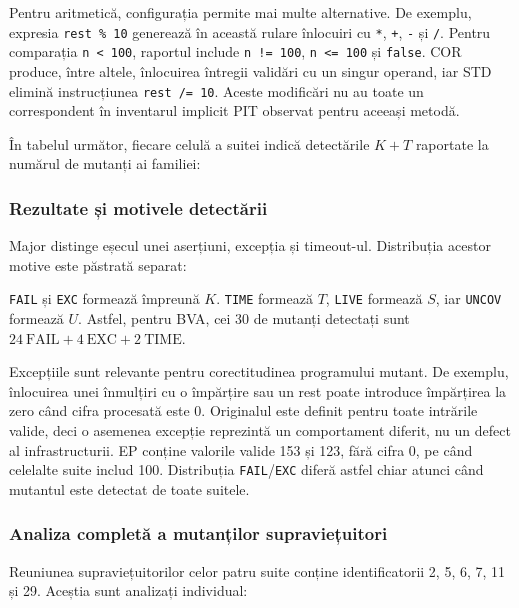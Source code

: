 \documentclass[11pt,a4paper]{article}
\begin{document}
Pentru aritmetică, configurația permite mai multe alternative.
De exemplu, expresia \texttt{rest \% 10} generează în această rulare
înlocuiri cu \texttt{*}, \texttt{+}, \texttt{-} și \texttt{/}.
Pentru comparația \texttt{n < 100}, raportul include
\texttt{n != 100}, \texttt{n <= 100} și \texttt{false}.
COR produce, între altele, înlocuirea întregii validări cu un singur operand,
iar STD elimină instrucțiunea \texttt{rest /= 10}.
Aceste modificări nu au toate un correspondent în inventarul implicit PIT
observat pentru aceeași metodă.

În tabelul următor, fiecare celulă a suitei indică detectările $K+T$
raportate la numărul de mutanți ai familiei:


\subsubsection{Rezultate și motivele detectării}


Major distinge eșecul unei aserțiuni, excepția și timeout-ul.
Distribuția acestor motive este păstrată separat:

\texttt{FAIL} și \texttt{EXC} formează împreună $K$.
\texttt{TIME} formează $T$, \texttt{LIVE} formează $S$, iar
\texttt{UNCOV} formează $U$.
Astfel, pentru BVA, cei 30 de mutanți detectați sunt
$24\ \mathrm{FAIL}+4\ \mathrm{EXC}+2\ \mathrm{TIME}$.

Excepțiile sunt relevante pentru corectitudinea programului mutant.
De exemplu, înlocuirea unei înmulțiri cu o împărțire sau un rest poate
introduce împărțirea la zero când cifra procesată este 0.
Originalul este definit pentru toate intrările valide, deci o asemenea
excepție reprezintă un comportament diferit, nu un defect al infrastructurii.
EP conține valorile valide 153 și 123, fără cifra 0, pe când celelalte
suite includ 100. Distribuția \texttt{FAIL}/\texttt{EXC} diferă astfel
chiar atunci când mutantul este detectat de toate suitele.

\subsubsection{Analiza completă a mutanților supraviețuitori}
Reuniunea supraviețuitorilor celor patru suite conține identificatorii
2, 5, 6, 7, 11 și 29. Aceștia sunt analizați individual:
\end{document}
